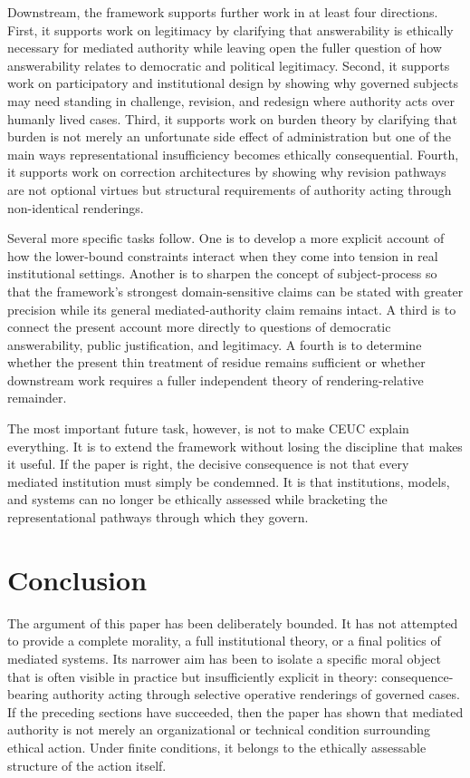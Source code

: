 \documentclass[11pt]{article}
\begin{document}
Downstream, the framework supports further work in at least four directions. First, it supports work on legitimacy by clarifying that answerability is ethically necessary for mediated authority while leaving open the fuller question of how answerability relates to democratic and political legitimacy. Second, it supports work on participatory and institutional design by showing why governed subjects may need standing in challenge, revision, and redesign where authority acts over humanly lived cases. Third, it supports work on burden theory by clarifying that burden is not merely an unfortunate side effect of administration but one of the main ways representational insufficiency becomes ethically consequential. Fourth, it supports work on correction architectures by showing why revision pathways are not optional virtues but structural requirements of authority acting through non-identical renderings.

Several more specific tasks follow. One is to develop a more explicit account of how the lower-bound constraints interact when they come into tension in real institutional settings. Another is to sharpen the concept of subject-process so that the framework's strongest domain-sensitive claims can be stated with greater precision while its general mediated-authority claim remains intact. A third is to connect the present account more directly to questions of democratic answerability, public justification, and legitimacy. A fourth is to determine whether the present thin treatment of residue remains sufficient or whether downstream work requires a fuller independent theory of rendering-relative remainder.

The most important future task, however, is not to make CEUC explain everything. It is to extend the framework without losing the discipline that makes it useful. If the paper is right, the decisive consequence is not that every mediated institution must simply be condemned. It is that institutions, models, and systems can no longer be ethically assessed while bracketing the representational pathways through which they govern.
\section{Conclusion}

The argument of this paper has been deliberately bounded. It has not attempted to provide a complete morality, a full institutional theory, or a final politics of mediated systems. Its narrower aim has been to isolate a specific moral object that is often visible in practice but insufficiently explicit in theory: consequence-bearing authority acting through selective operative renderings of governed cases. If the preceding sections have succeeded, then the paper has shown that mediated authority is not merely an organizational or technical condition surrounding ethical action. Under finite conditions, it belongs to the ethically assessable structure of the action itself.
\end{document}
